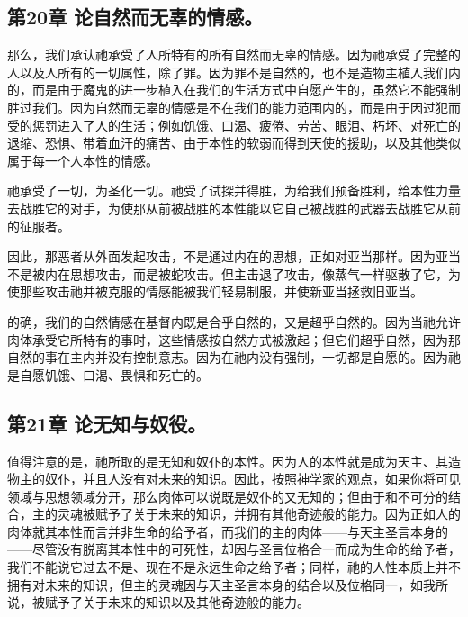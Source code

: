 \subsection{第20章 论自然而无辜的情感。}

那么，我们承认祂承受了人所特有的所有自然而无辜的情感。因为祂承受了完整的人以及人所有的一切属性，除了罪。因为罪不是自然的，也不是造物主植入我们内的，而是由于魔鬼的进一步植入在我们的生活方式中自愿产生的，虽然它不能强制胜过我们。因为自然而无辜的情感是不在我们的能力范围内的，而是由于因过犯而受的惩罚进入了人的生活；例如饥饿、口渴、疲倦、劳苦、眼泪、朽坏、对死亡的退缩、恐惧、带着血汗的痛苦、由于本性的软弱而得到天使的援助，以及其他类似属于每一个人本性的情感。\par

祂承受了一切，为圣化一切。祂受了试探并得胜，为给我们预备胜利，给本性力量去战胜它的对手，为使那从前被战胜的本性能以它自己被战胜的武器去战胜它从前的征服者。\par

因此，那恶者从外面发起攻击，不是通过内在的思想，正如对亚当那样。因为亚当不是被内在思想攻击，而是被蛇攻击。但主击退了攻击，像蒸气一样驱散了它，为使那些攻击祂并被克服的情感能被我们轻易制服，并使新亚当拯救旧亚当。\par

的确，我们的自然情感在基督内既是合乎自然的，又是超乎自然的。因为当祂允许肉体承受它所特有的事时，这些情感按自然方式被激起；但它们超乎自然，因为那自然的事在主内并没有控制意志。因为在祂内没有强制，一切都是自愿的。因为祂是自愿饥饿、口渴、畏惧和死亡的。\par


\subsection{第21章 论无知与奴役。}

值得注意的是，祂所取的是无知和奴仆的本性。因为人的本性就是成为天主、其造物主的奴仆，并且人没有对未来的知识。因此，按照神学家的观点，如果你将可见领域与思想领域分开，那么肉体可以说既是奴仆的又无知的；但由于和不可分的结合，主的灵魂被赋予了关于未来的知识，并拥有其他奇迹般的能力。因为正如人的肉体就其本性而言并非生命的给予者，而我们的主的肉体——与天主圣言本身的——尽管没有脱离其本性中的可死性，却因与圣言位格合一而成为生命的给予者，我们不能说它过去不是、现在不是永远生命之给予者；同样，祂的人性本质上并不拥有对未来的知识，但主的灵魂因与天主圣言本身的结合以及位格同一，如我所说，被赋予了关于未来的知识以及其他奇迹般的能力。\par

